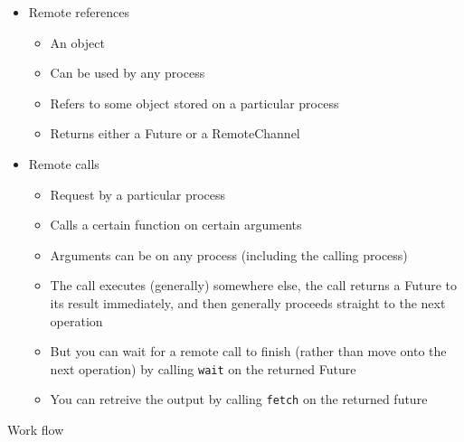 \documentclass[12pt]{article}
\theoremstyle{plain}
\theoremstyle{definition}
\theoremstyle{remark}
\begin{document}
\begin{itemize}
  \item Remote references
    \begin{itemize}
      \item An object
      \item Can be used by any process
      \item Refers to some object stored on a particular process
      \item Returns either a Future or a RemoteChannel
    \end{itemize}

  \item Remote calls
    \begin{itemize}
      \item Request by a particular process
      \item Calls a certain function on certain arguments
      \item Arguments can be on any process (including the calling
        process)
      \item The call executes (generally) somewhere else,
        the call returns a Future to its result immediately, and then
        generally proceeds straight to the next operation
      \item But you can wait for a remote call to finish (rather
        than move onto the next operation) by calling \texttt{wait}
        on the returned Future
      \item You can retreive the output by calling \texttt{fetch} on the
        returned future
    \end{itemize}
\end{itemize}
Work flow
\end{document}
